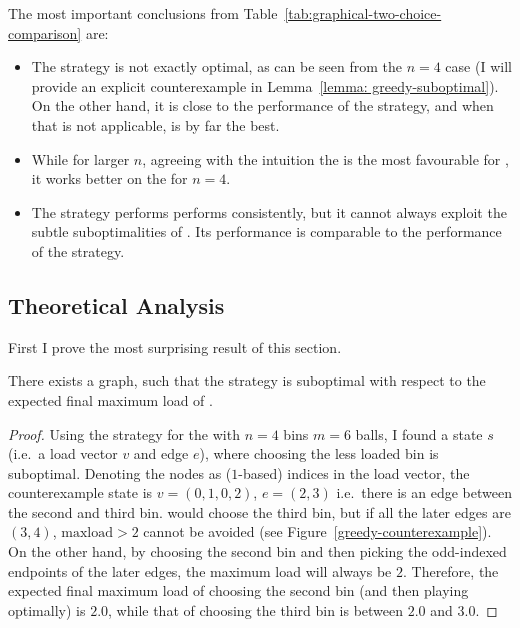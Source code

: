 
The most important conclusions from Table~\ref{tab:graphical-two-choice-comparison} are:

\begin{itemize}
    \item The \Greedy strategy is not exactly optimal, as can be seen from the $n=4$ case (I will provide an explicit counterexample in Lemma~\ref{lemma: greedy-suboptimal}). On the other hand, it is close to the performance of the \DP strategy, and when that is not applicable, \Greedy is by far the best.
    \item While for larger $n$, agreeing with the intuition the \CompleteGraph is the most favourable for \Greedy, it works better on the \CycleGraph for $n=4$. 
    \item The \DQN strategy performs performs consistently, but it cannot always exploit the subtle suboptimalities of \Greedy. Its performance is comparable to the performance of the \LocalRewardOptimiser strategy.
    
\end{itemize}


\subsection{Theoretical Analysis}

First I prove the most surprising result of this section.

\begin{lemma} \label{lemma: greedy-suboptimal}
There exists a graph, such that the \Greedy strategy is suboptimal with respect to the expected final maximum load of \GraphicalTwoChoice.
\end{lemma}

\begin{proof}
Using the \DP strategy for the \CycleGraph with $n=4$ bins $m=6$ balls, I found a state $s$ (i.e.\ a load vector $v$ and edge $e$), where choosing the less loaded bin is suboptimal. Denoting the nodes as ($1$-based) indices in the load vector, the counterexample state is $v=(0,1,0,2)$,  $e=(2,3)$ i.e.\ there is an edge between the second and third bin. \Greedy would choose the third bin, but if all the later edges are $(3,4)$, $\mathrm{maxload}>2$ cannot be avoided (see Figure~\ref{greedy-counterexample}). On the other hand, by choosing the second bin and then picking the odd-indexed endpoints of the later edges, the maximum load will always be $2$. Therefore, the expected final maximum load of choosing the second bin (and then playing optimally) is $2.0$, while that of choosing the third bin is between $2.0$ and $3.0$.
\end{proof}



